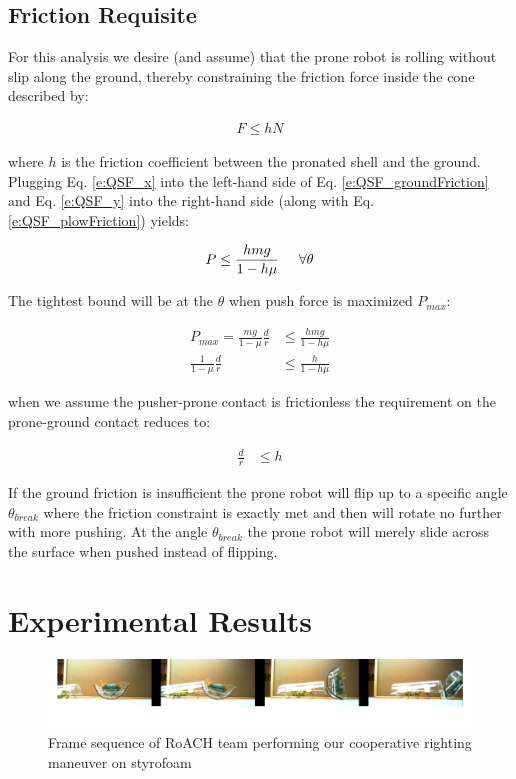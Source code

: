 \documentclass[letterpaper]{report}
\begin{document}
\subsection{Friction Requisite}
For this analysis we desire (and assume) that the prone robot is rolling without slip along the ground, thereby constraining the friction force inside the cone described by:

\begin{align}
  F \leq h N \label{e:QSF_groundFriction}
\end{align}

where $h$ is the friction coefficient between the pronated shell and the ground.
Plugging Eq. \ref{e:QSF_x} into the left-hand side of Eq. \ref{e:QSF_groundFriction} and Eq. \ref{e:QSF_y} into the right-hand side (along with Eq. \ref{e:QSF_plowFriction}) yields:

\begin{align}
  P \leq \frac{hmg}{1-h\mu} \label{e:QSF_pushConstraint1} \hspace{5mm} \forall \theta
\end{align}

The tightest bound will be at the $\theta$ when push force is maximized $P_{max}$:

\begin{align}
  P_{max} = \frac{mg}{1-\mu} \frac{d}{r} &\leq \frac{hmg}{1-h\mu} \\
  \frac{1}{1-\mu} \frac{d}{r} &\leq \frac{h}{1-h\mu}
  \label{e:gndFrictionReq}
\end{align}

when we assume the pusher-prone contact is frictionless the requirement on the prone-ground contact reduces to:

\begin{align}
  \frac{d}{r} &\leq h
\end{align}

If the ground friction is insufficient the prone robot will flip up to a specific angle $\theta_{break}$ where the friction constraint is exactly met and then will rotate no further with more pushing.
At the angle $\theta_{break}$ the prone robot will merely slide across the surface when pushed instead of flipping.

\section{Experimental Results}
\begin{figure}[ht]
\centering
\includegraphics[width=1.0\textwidth]{QSFlipStrip3.png}
\caption{Frame sequence of RoACH team performing our cooperative righting maneuver on styrofoam}
\end{figure}
\end{document}
